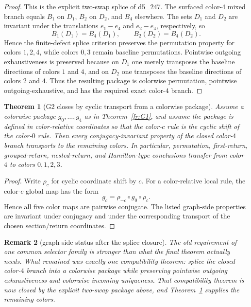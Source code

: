\documentclass[11pt]{article}
\newtheorem{theorem}{Theorem}[section]
\newtheorem{remark}[theorem]{Remark}
\begin{document}
\begin{proof}
This is the explicit two-swap splice of d5\_247.
The surfaced color-$4$ mixed branch equals \(B_1\) on \(D_1\), \(B_2\) on \(D_2\),
and \(B_4\) elsewhere.
The sets \(D_1\) and \(D_2\) are invariant under the translations
\(e_1-e_4\) and \(e_2-e_4\), respectively, so
\[
B_1(D_1)=B_4(D_1),
\qquad
B_2(D_2)=B_4(D_2).
\]
Hence the finite-defect splice criterion preserves the permutation property for
colors \(1,2,4\), while colors \(0,3\) remain baseline permutations.
Pointwise outgoing exhaustiveness is preserved because on \(D_1\) one merely
transposes the baseline directions of colors \(1\) and \(4\), and on \(D_2\) one
transposes the baseline directions of colors \(2\) and \(4\).
Thus the resulting package is colorwise permutation, pointwise outgoing-exhaustive,
and has the required exact color-$4$ branch.
\end{proof}

\begin{theorem}[G2 closes by cyclic transport from a colorwise package]
\label{thm:G2-closed}
Assume a colorwise package \(g_0,\dots,g_4\) as in
Theorem~\ref{fr:G1}, and assume the package is defined in color-relative
coordinates so that the color-$c$ rule is the cyclic shift of the color-$0$
rule.  Then every conjugacy-invariant property of the closed color-$4$ branch
transports to the remaining colors.  In particular, permutation, first-return,
grouped-return, nested-return, and Hamilton-type conclusions transfer from
color $4$ to colors \(0,1,2,3\).
\end{theorem}

\begin{proof}
Write \(\rho_c\) for cyclic coordinate shift by \(c\).  For a color-relative
local rule, the color-$c$ global map has the form
\[
 g_c = \rho_{-c}\circ g_0\circ \rho_c.
\]
Hence all five color maps are pairwise conjugate.  The listed graph-side
properties are invariant under conjugacy and under the corresponding transport
of the chosen section/return coordinates.
\end{proof}

\begin{remark}[graph-side status after the splice closure]
The old requirement of one common selector family is stronger than what the
final theorem actually needs.
What remained was exactly one compatibility theorem: splice the closed color-$4$
branch into a colorwise package while preserving pointwise outgoing
exhaustiveness and colorwise incoming uniqueness.
That compatibility theorem is now closed by the explicit two-swap package above,
and Theorem~\ref{thm:G2-closed} supplies the remaining colors.
\end{remark}
\end{document}
